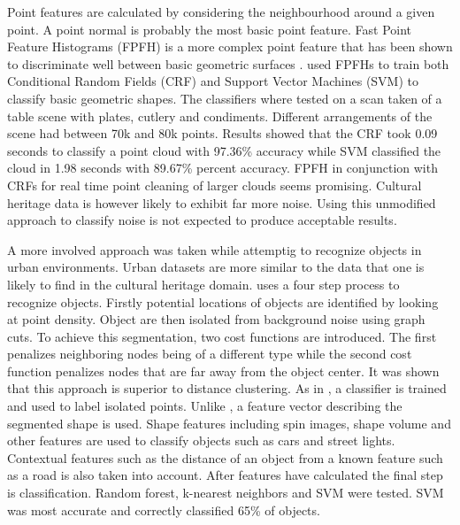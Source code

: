 \documentclass[10pt,twocolumn]{article}
\begin{document}
Point features are calculated by considering the neighbourhood around a given point. A point normal is probably the most basic point feature. Fast Point Feature Histograms (FPFH) is a more complex point feature that has been shown to discriminate well between basic geometric surfaces \cite{Rusu2009}. \citeauthor{Rusu2009} used FPFHs to train both Conditional Random Fields (CRF) and Support Vector Machines (SVM) to classify basic geometric shapes. The classifiers where tested on a scan taken of a table scene with plates, cutlery and condiments. Different arrangements of the scene had between 70k and 80k p\citeauthor{Golovinskiy2009}oints. Results showed that the CRF took 0.09 seconds to classify a point cloud with 97.36\% accuracy while SVM classified the cloud in 1.98 seconds with 89.67\% percent accuracy. FPFH in conjunction with CRFs for real time point cleaning of larger clouds seems promising. Cultural heritage data is however likely to exhibit far more noise. Using this unmodified approach to classify noise is not expected to produce acceptable results.

A more involved approach was taken while attemptig to recognize objects in urban environments. Urban datasets are more similar to the data that one is likely to find in the cultural heritage domain. \citeauthor{Golovinskiy2009} uses a four step process to recognize objects. Firstly potential locations of objects are identified by looking at point density. Object are then isolated from background noise using graph cuts. To achieve this segmentation, two cost functions are introduced. The first penalizes neighboring nodes being of a different type while the second cost function penalizes nodes that are far away from the object center. It was shown that this approach is superior to distance clustering. As in \cite{Rusu2009}, a classifier is trained and used to label isolated points. Unlike \cite{Rusu2009}, a feature vector describing the segmented shape is used. Shape features including spin images, shape volume and other features are used to classify objects such as cars and street lights. Contextual features such as the distance of an object from a known feature such as a road is also taken into account. After features have calculated the final step is classification. Random forest, k-nearest neighbors and SVM were tested. SVM was most accurate and correctly classified 65\% of objects.

\end{document}
